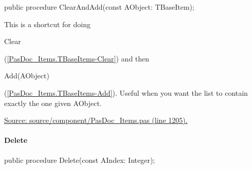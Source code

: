 \documentclass{report}
\newif\ifpdf
\begin{document}
\label{PasDoc_Items.TBaseItems-ClearAndAdd}
\begin{list}{}{
\setlength{\itemindent}{0cm}
\setlength{\listparindent}{0cm}
\setlength{\leftmargin}{\evensidemargin}
\addtolength{\leftmargin}{\tmplength}
\settowidth{\labelsep}{X}
\addtolength{\leftmargin}{\labelsep}
\setlength{\labelwidth}{\tmplength}
}
\item[\textbf{Declaration}\hfill]
\ifpdf
\begin{flushleft}
\fi
\begin{ttfamily}
public procedure ClearAndAdd(const AObject: TBaseItem);\end{ttfamily}

\ifpdf
\end{flushleft}
\fi

\par
\item[\textbf{Description}]
This is a shortcut for doing \begin{ttfamily}Clear\end{ttfamily}(\ref{PasDoc_Items.TBaseItems-Clear}) and then \begin{ttfamily}Add(AObject)\end{ttfamily}(\ref{PasDoc_Items.TBaseItems-Add}). Useful when you want the list to contain exactly the one given AObject.\par
\href{https://github.com/pasdoc/pasdoc/blob/master/source/component/PasDoc_Items.pas#L1205}{Source: source/component/PasDoc{\_}Items.pas (line 1205).}

\end{list}
\paragraph*{Delete}\hspace*{\fill}

\label{PasDoc_Items.TBaseItems-Delete}
\begin{list}{}{
\setlength{\itemindent}{0cm}
\setlength{\listparindent}{0cm}
\setlength{\leftmargin}{\evensidemargin}
\addtolength{\leftmargin}{\tmplength}
\settowidth{\labelsep}{X}
\addtolength{\leftmargin}{\labelsep}
\setlength{\labelwidth}{\tmplength}
}
\item[\textbf{Declaration}\hfill]
\ifpdf
\begin{flushleft}
\fi
\begin{ttfamily}
public procedure Delete(const AIndex: Integer);\end{ttfamily}

\ifpdf
\end{flushleft}
\fi

\end{list}
\end{document}
